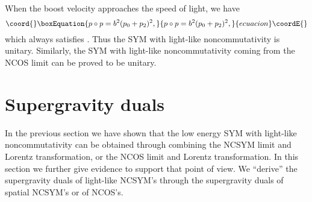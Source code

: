 \documentclass[a4paper,12pt]{article}
\providecommand{\sect}[1]{\setcounter{equation}{0}\section{#1}}
\begin{document}
When the boost velocity approaches the speed of light, we have
\begin{equation}\coord{}\boxEquation{
p\circ p = b^2(p_0 +p_2)^2,
}{
p\circ p = b^2(p_0 +p_2)^2,
}{ecuacion}\coordE{}\end{equation}
which always satisfies \coordHE{}. Thus the SYM with light-like
noncommutativity is unitary. Similarly, the SYM with light-like
noncommutativity coming from the NCOS limit can be proved to be unitary.




\sect{Supergravity duals }

In the previous section we have shown that the low energy SYM with light-like
noncommutativity can be obtained through combining the NCSYM limit and Lorentz
transformation, or the NCOS limit and Lorentz transformation. In this section
we further give evidence to support that point of view. We ``derive'' the
supergravity duals of light-like NCSYM's through the
supergravity duals of spatial NCSYM's or of NCOS's.
\end{document}
